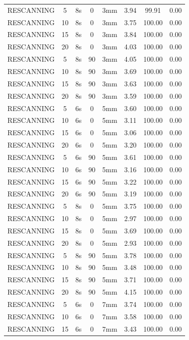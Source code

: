 \documentclass[type=dr, dr=rernat, accentcolor=tud7b,colorbacktitle, bigchapter, openright, twoside, 12pt ]{tudthesis}
\begin{document}
\begin{table}[H]
\begin{tabular}{|c|c||c|c|c||c|c|c|}
RESCANNING & 5 & 8s & 0 & 3mm & 3.94 & 99.91 & 0.00 \\
RESCANNING & 10 & 8s & 0 & 3mm & 3.75 & 100.00 & 0.00 \\
RESCANNING & 15 & 8s & 0 & 3mm & 3.84 & 100.00 & 0.00 \\
RESCANNING & 20 & 8s & 0 & 3mm & 4.03 & 100.00 & 0.00 \\
RESCANNING & 5 & 8s & 90 & 3mm & 4.05 & 100.00 & 0.00 \\
RESCANNING & 10 & 8s & 90 & 3mm & 3.69 & 100.00 & 0.00 \\
RESCANNING & 15 & 8s & 90 & 3mm & 3.63 & 100.00 & 0.00 \\
RESCANNING & 20 & 8s & 90 & 3mm & 3.59 & 100.00 & 0.00 \\
RESCANNING & 5 & 6s & 0 & 5mm & 3.60 & 100.00 & 0.00 \\
RESCANNING & 10 & 6s & 0 & 5mm & 3.11 & 100.00 & 0.00 \\
RESCANNING & 15 & 6s & 0 & 5mm & 3.06 & 100.00 & 0.00 \\
RESCANNING & 20 & 6s & 0 & 5mm & 3.20 & 100.00 & 0.00 \\
RESCANNING & 5 & 6s & 90 & 5mm & 3.61 & 100.00 & 0.00 \\
RESCANNING & 10 & 6s & 90 & 5mm & 3.16 & 100.00 & 0.00 \\
RESCANNING & 15 & 6s & 90 & 5mm & 3.22 & 100.00 & 0.00 \\
RESCANNING & 20 & 6s & 90 & 5mm & 3.19 & 100.00 & 0.00 \\
RESCANNING & 5 & 8s & 0 & 5mm & 3.75 & 100.00 & 0.00 \\
RESCANNING & 10 & 8s & 0 & 5mm & 2.97 & 100.00 & 0.00 \\
RESCANNING & 15 & 8s & 0 & 5mm & 3.69 & 100.00 & 0.00 \\
RESCANNING & 20 & 8s & 0 & 5mm & 2.93 & 100.00 & 0.00 \\
RESCANNING & 5 & 8s & 90 & 5mm & 3.78 & 100.00 & 0.00 \\
RESCANNING & 10 & 8s & 90 & 5mm & 3.48 & 100.00 & 0.00 \\
RESCANNING & 15 & 8s & 90 & 5mm & 3.71 & 100.00 & 0.00 \\
RESCANNING & 20 & 8s & 90 & 5mm & 4.15 & 100.00 & 0.00 \\
RESCANNING & 5 & 6s & 0 & 7mm & 3.74 & 100.00 & 0.00 \\
RESCANNING & 10 & 6s & 0 & 7mm & 3.58 & 100.00 & 0.00 \\
RESCANNING & 15 & 6s & 0 & 7mm & 3.43 & 100.00 & 0.00 \\

\end{tabular}
\end{table}
\end{document}
